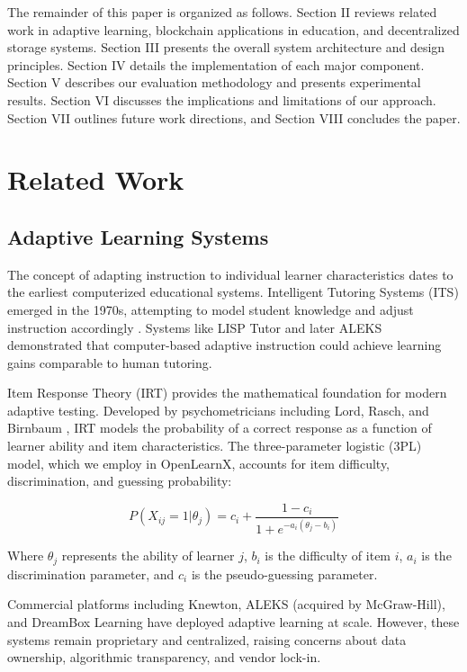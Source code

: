 \documentclass[conference]{IEEEtran}
\begin{document}
The remainder of this paper is organized as follows. Section II reviews related work in adaptive learning, blockchain applications in education, and decentralized storage systems. Section III presents the overall system architecture and design principles. Section IV details the implementation of each major component. Section V describes our evaluation methodology and presents experimental results. Section VI discusses the implications and limitations of our approach. Section VII outlines future work directions, and Section VIII concludes the paper.

\section{Related Work}

\subsection{Adaptive Learning Systems}

The concept of adapting instruction to individual learner characteristics dates to the earliest computerized educational systems. Intelligent Tutoring Systems (ITS) emerged in the 1970s, attempting to model student knowledge and adjust instruction accordingly \cite{b5}. Systems like LISP Tutor and later ALEKS demonstrated that computer-based adaptive instruction could achieve learning gains comparable to human tutoring.

Item Response Theory (IRT) provides the mathematical foundation for modern adaptive testing. Developed by psychometricians including Lord, Rasch, and Birnbaum \cite{b6}, IRT models the probability of a correct response as a function of learner ability and item characteristics. The three-parameter logistic (3PL) model, which we employ in OpenLearnX, accounts for item difficulty, discrimination, and guessing probability:

\begin{equation}
P(X_{ij} = 1 | \theta_j) = c_i + \frac{1 - c_i}{1 + e^{-a_i(\theta_j - b_i)}}
\label{eq:irt}
\end{equation}

Where $\theta_j$ represents the ability of learner $j$, $b_i$ is the difficulty of item $i$, $a_i$ is the discrimination parameter, and $c_i$ is the pseudo-guessing parameter.

Commercial platforms including Knewton, ALEKS (acquired by McGraw-Hill), and DreamBox Learning have deployed adaptive learning at scale. However, these systems remain proprietary and centralized, raising concerns about data ownership, algorithmic transparency, and vendor lock-in.
\end{document}
